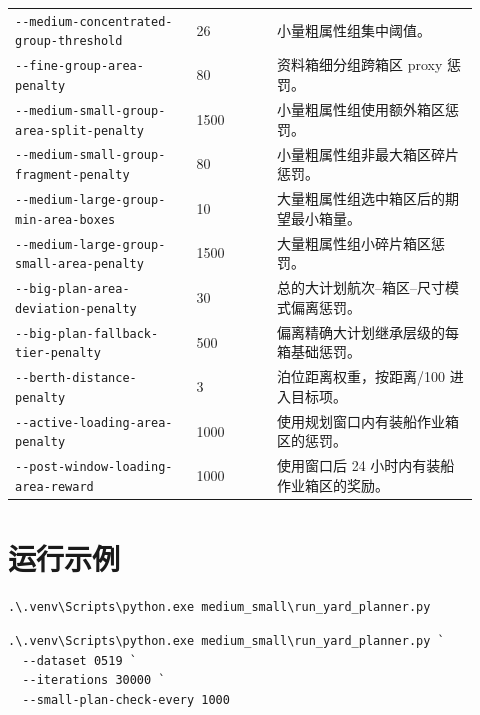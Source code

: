 \documentclass[UTF8,a4paper,11pt]{ctexart}
\newcommand{\code}[1]{\nolinkurl{#1}}
\begin{document}
\begin{longtable}{L{0.36\linewidth}L{0.16\linewidth}L{0.40\linewidth}}
\code{--medium-concentrated-group-threshold} & 26 & 小量粗属性组集中阈值。\\
\code{--fine-group-area-penalty} & 80 & 资料箱细分组跨箱区 proxy 惩罚。\\
\code{--medium-small-group-area-split-penalty} & 1500 & 小量粗属性组使用额外箱区惩罚。\\
\code{--medium-small-group-fragment-penalty} & 80 & 小量粗属性组非最大箱区碎片惩罚。\\
\code{--medium-large-group-min-area-boxes} & 10 & 大量粗属性组选中箱区后的期望最小箱量。\\
\code{--medium-large-group-small-area-penalty} & 1500 & 大量粗属性组小碎片箱区惩罚。\\
\code{--big-plan-area-deviation-penalty} & 30 & 总的大计划航次--箱区--尺寸模式偏离惩罚。\\
\code{--big-plan-fallback-tier-penalty} & 500 & 偏离精确大计划继承层级的每箱基础惩罚。\\
\code{--berth-distance-penalty} & 3 & 泊位距离权重，按距离/100 进入目标项。\\
\code{--active-loading-area-penalty} & 1000 & 使用规划窗口内有装船作业箱区的惩罚。\\
\code{--post-window-loading-area-reward} & 1000 & 使用窗口后 24 小时内有装船作业箱区的奖励。\\
\bottomrule
\end{longtable}

\section{运行示例}

\begin{lstlisting}
.\.venv\Scripts\python.exe medium_small\run_yard_planner.py
\end{lstlisting}

\begin{lstlisting}
.\.venv\Scripts\python.exe medium_small\run_yard_planner.py `
  --dataset 0519 `
  --iterations 30000 `
  --small-plan-check-every 1000
\end{lstlisting}
\end{document}

